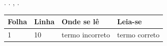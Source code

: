 \clearpage
\begin{errata}
\imprimirautor. \textbf{\imprimirtitulo}. \imprimirlocal, \imprimirdata.

\begin{center}
\begin{tabular}{llll}
  \toprule
  \textbf{Folha} & \textbf{Linha} & \textbf{Onde se lê} & \textbf{Leia-se} \\
  \midrule
  1 & 10 & termo incorreto & termo correto \\
  \bottomrule
\end{tabular}
\end{center}
\end{errata}
\clearpage
